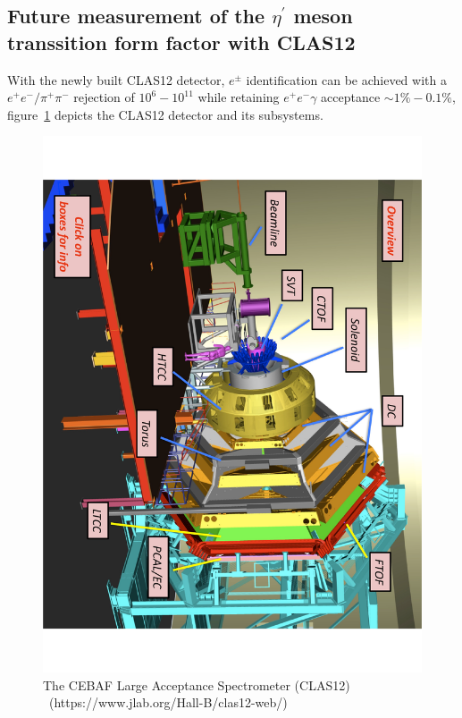 \documentclass{aip-cp}
\begin{document}
\subsection{Future measurement of the $\eta^\prime$ meson transsition form factor with CLAS12}
With the newly built CLAS12 detector, $e^{\pm}$ identification can be achieved with a $e^{+}e^{-}/\pi^{+}\pi^{-}$ rejection of  $10^{6}-10^{11}$ while retaining $e^+ e^- \gamma$ acceptance $\sim 1 \% - 0.1 \%$, figure~\ref{fig:clas12} depicts the CLAS12 detector and its subsystems.
\begin{figure}[h!]
	\centerline{\includegraphics[width=200 pt, angle = 90]{figures/clas12-design.pdf}}
	\caption{The CEBAF Large Acceptance Spectrometer (CLAS12)\\~(https://www.jlab.org/Hall-B/clas12-web/)}
	\label{fig:clas12}
\end{figure}
\end{document}

